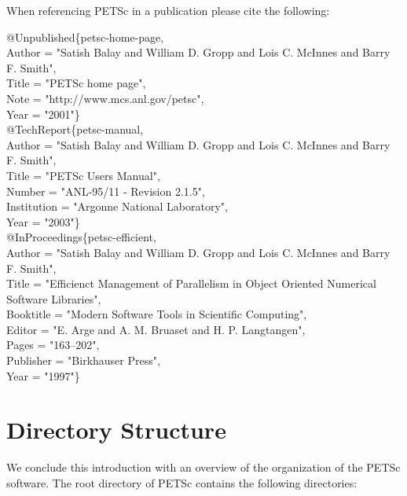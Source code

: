 When referencing PETSc in a publication please cite the following:
\begin{tabbing}
@Unpublished\{petsc-home-page,\\
   Author = "Satish Balay and William D. Gropp and Lois C. McInnes and Barry F. Smith",\\
   Title  = "PETSc home page",\\
   Note   = "http://www.mcs.anl.gov/petsc",\\
   Year   = "2001"\}\\

@TechReport\{petsc-manual,\\
   Author      = "Satish Balay and William D. Gropp and Lois C. McInnes and Barry F. Smith",\\
   Title       = "PETSc Users Manual",\\
   Number      = "ANL-95/11 - Revision 2.1.5",\\
   Institution = "Argonne National Laboratory",\\
   Year        = "2003"\}\\

@InProceedings\{petsc-efficient,\\
   Author    = "Satish Balay and William D. Gropp and Lois C. McInnes and Barry F. Smith",\\
   Title     = "Efficienct Management of Parallelism in Object Oriented Numerical Software Libraries",\\
   Booktitle = "Modern Software Tools in Scientific Computing",\\
   Editor    = "E. Arge and A. M. Bruaset and H. P. Langtangen",\\
   Pages     = "163--202",\\
   Publisher = "Birkhauser Press",\\
   Year      = "1997"\}
\end{tabbing}



\section{Directory Structure}

We conclude this introduction with an overview of the
organization of the PETSc software.  
The root directory of PETSc contains the following directories:

